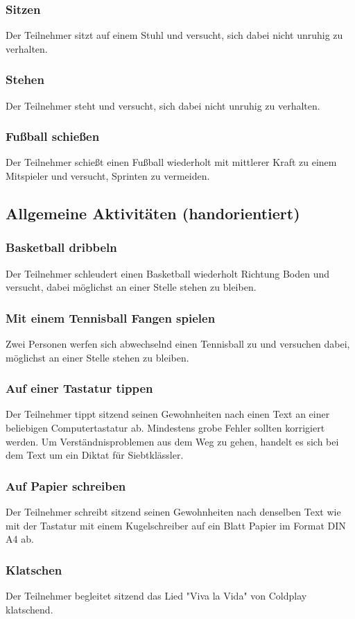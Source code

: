 \subsubsection{Sitzen}
Der Teilnehmer sitzt auf einem Stuhl und versucht, sich dabei nicht unruhig zu verhalten.
\subsubsection{Stehen}
Der Teilnehmer steht und versucht, sich dabei nicht unruhig zu verhalten.
\subsubsection{Fußball schießen}
Der Teilnehmer schießt einen Fußball wiederholt mit mittlerer Kraft zu einem Mitspieler und versucht, Sprinten zu vermeiden.

\subsection{Allgemeine Aktivitäten (handorientiert)}
\subsubsection{Basketball dribbeln}
Der Teilnehmer schleudert einen Basketball wiederholt Richtung Boden und versucht, dabei möglichst an einer Stelle stehen zu bleiben.
\subsubsection{Mit einem Tennisball Fangen spielen}
Zwei Personen werfen sich abwechselnd einen Tennisball zu und versuchen dabei, möglichst an einer Stelle stehen zu bleiben.
\subsubsection{Auf einer Tastatur tippen}
Der Teilnehmer tippt sitzend seinen Gewohnheiten nach einen Text an einer beliebigen Computertastatur ab. Mindestens grobe Fehler sollten korrigiert werden. Um Verständnisproblemen aus dem Weg zu gehen, handelt es sich bei dem Text um ein Diktat für Siebtklässler.
\subsubsection{Auf Papier schreiben}
Der Teilnehmer schreibt sitzend seinen Gewohnheiten nach denselben Text wie mit der Tastatur mit einem Kugelschreiber auf ein Blatt Papier im Format DIN A4 ab.
\subsubsection{Klatschen}
Der Teilnehmer begleitet sitzend das Lied "Viva la Vida" von Coldplay klatschend.

